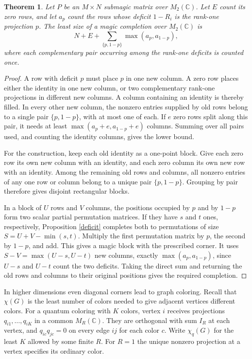 \documentclass[11pt,a4paper]{article}
\newtheorem{thm}{Theorem}[section]
\begin{document}
\begin{thm}\label{planarcompletion}
Let $P$ be an $M\times N$ submagic matrix over $M_2(\mathbb C)$. Let $E$ count its zero rows, and let $a_p$ count the rows whose deficit $1-R_i$ is the rank-one projection $p$. The least size of a magic completion over $M_2(\mathbb C)$ is
\[
 N+E+\sum_{\{p,1-p\}}\max(a_p,a_{1-p}),
\]
where each complementary pair occurring among the rank-one deficits is counted once.
\end{thm}
\begin{proof}
A row with deficit $p$ must place $p$ in one new column. A zero row places either the identity in one new column, or two complementary rank-one projections in different new columns. A column containing an identity is thereby filled. In every other new column, the nonzero entries supplied by old rows belong to a single pair $\{p,1-p\}$, with at most one of each. If $e$ zero rows split along this pair, it needs at least $\max(a_p+e,a_{1-p}+e)$ columns. Summing over all pairs used, and counting the identity columns, gives the lower bound.

For the construction, keep each old identity as a one-point block. Give each zero row its own new column with an identity, and each zero column its own new row with an identity. Among the remaining old rows and columns, all nonzero entries of any one row or column belong to a unique pair $\{p,1-p\}$. Grouping by pair therefore gives disjoint rectangular blocks.

In a block of $U$ rows and $V$ columns, the positions occupied by $p$ and by $1-p$ form two scalar partial permutation matrices. If they have $s$ and $t$ ones, respectively, Proposition \ref{deficit} completes both to permutations of size $S=U+V-\min(s,t)$. Multiply the first permutation matrix by $p$, the second by $1-p$, and add. This gives a magic block with the prescribed corner. It uses $S-V=\max(U-s,U-t)$ new columns, exactly $\max(a_p,a_{1-p})$, since $U-s$ and $U-t$ count the two deficits. Taking the direct sum and returning the old rows and columns to their original positions gives the required completion.
\end{proof}

In higher dimensions even diagonal corners lead to graph coloring. Recall that $\chi(G)$ is the least number of colors needed to give adjacent vertices different colors. For a quantum coloring \cite{coloring} with $K$ colors, vertex $i$ receives projections $q_{i1},\ldots,q_{iK}$ in a common $M_R(\mathbb C)$. They are orthogonal with sum $I_R$ at each vertex, and $q_{ic}q_{jc}=0$ on every edge $ij$ for each color $c$. Write $\chi_q(G)$ for the least $K$ allowed by some finite $R$. For $R=1$ the unique nonzero projection at a vertex specifies its ordinary color.
\end{document}
